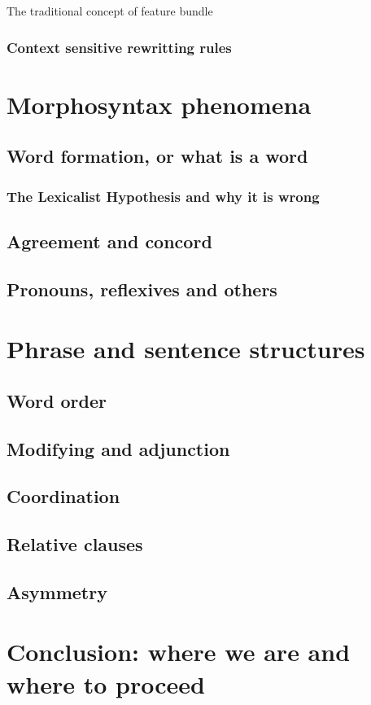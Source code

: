 \documentclass[a4paper]{article}
\begin{document}
The traditional concept of feature bundle 

\subsubsection{Context sensitive rewritting rules}


\section{Morphosyntax phenomena}

\subsection{Word formation, or what is a word}

\subsubsection{The Lexicalist Hypothesis and why it is wrong}

\subsection{Agreement and concord}

\subsection{Pronouns, reflexives and others}

\section{Phrase and sentence structures}

\subsection{Word order}

\subsection{Modifying and adjunction}

\subsection{Coordination}

\subsection{Relative clauses}

\subsection{Asymmetry}


\section{Conclusion: where we are and where to proceed}

\end{document}
